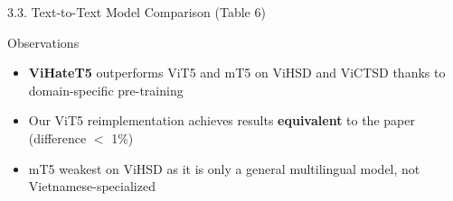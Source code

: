 \documentclass[11pt, aspectratio=169]{beamer}
\begin{document}
\begin{frame}[shrink=8]{3.3. Text-to-Text Model Comparison (Table 6)}

\begin{table}[h]
  \centering
  \caption{Comparison with Text-to-Text architecture models}
  \vspace{0.2cm}
\end{table}

\begin{block}{Observations}
  \begin{itemize}
    \item \textbf{ViHateT5} outperforms ViT5 and mT5 on ViHSD and ViCTSD thanks to domain-specific pre-training
    \item Our ViT5 reimplementation achieves results \textbf{equivalent} to the paper (difference $<$ 1\%)
    \item mT5 weakest on ViHSD as it is only a general multilingual model, not Vietnamese-specialized
  \end{itemize}
\end{block}
\end{frame}
\end{document}
